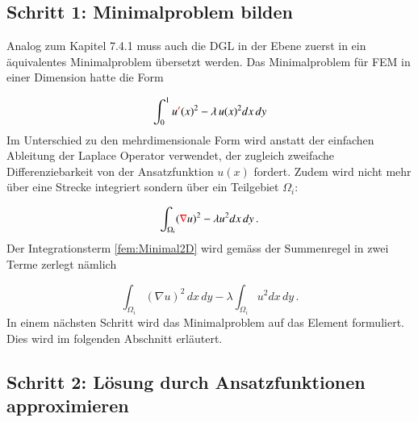 \subsection{Schritt 1: Minimalproblem bilden}

Analog zum Kapitel 7.4.1 muss auch die DGL in der Ebene zuerst in ein äquivalentes Minimalproblem übersetzt werden. Das Minimalproblem für FEM in einer Dimension hatte die Form

\begin{equation}
			\int_0^1 u \textcolor{red}{'} (x)^2 - \lambda \, u(x)^2 dx \,dy
			\label{fem:Minimal1D}
\end{equation}
Im Unterschied zu den mehrdimensionale Form wird anstatt der einfachen Ableitung der Laplace Operator verwendet, der zugleich zweifache Differenziebarkeit von der Ansatzfunktion $u(x)$ fordert. Zudem wird nicht mehr über eine Strecke integriert sondern über ein Teilgebiet $\Omega_i$:

\begin{equation}
			\int_{\Omega_i} (\textcolor{red}{\nabla} u)^2 - \lambda u^2 dx \, dy \, .
			\label{fem:Minimal2D}
\end{equation}
Der Integrationsterm \eqref{fem:Minimal2D} wird gemäss der Summenregel in zwei Terme zerlegt nämlich 

\begin{equation}
			\int_{\Omega_i} (\nabla u)^2 \, dx \, dy - \lambda \int_{\Omega_i} u^2 dx \, dy \, .
			\label{fem:Minimal2D2Term}
\end{equation}
In einem nächsten Schritt wird das Minimalproblem auf das Element formuliert. Dies wird im folgenden Abschnitt erläutert.

\subsection{Schritt 2: Lösung durch Ansatzfunktionen approximieren}

